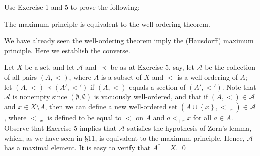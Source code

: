 \documentclass[a4paper,12pt]{article}
\begin{document}
\begin{exe}
	Use Exercise 1 and 5 to prove the following:\leavevmode \par
	\noindent {}\;\;
	The maximum principle is equivalent to the well-ordering theorem.
\end{exe}
\begin{sol}
	We have already seen the well-ordering theorem imply the (Hausdorff) maximum principle.
	Here we establish the converse.
	
	Let \( X \) be a set,
	and let \( \mathcal{A} \) and \( \prec \) be as at Exercise 5,
	say, let \( \mathcal{A} \) be the collection of all pairs \( (A,<) \),
	where \( A \) is a subset of \( X \)
	and \( < \) is a well-ordering of \( A \);
	let \( (A,<) \prec (A',<') \)
	if \( (A,<) \) equals a section of \( (A',<') \).
	Note that \( \mathcal{A} \) is nonempty since \( (\emptyset,\emptyset) \) is vacuously well-ordered,
	and that if \( (A,<) \in \mathcal{A} \) and \( x\in X \setminus A \),
	then we can define a new well-ordered set
	\( (A\cup \left\{ x \right\}, <_{+x})\in \mathcal{A} \),
	where \( <_{+x} \) is defined to be equal to \( < \) on \( A \)
	and \( a <_{+x} x \) for all \( a\in A \).
	Observe that Exercise 5 implies that
	\( \mathcal{A} \) satisfies the hypothesis of Zorn's lemma,
	which, as we have seen in \S11, is equivalent to the maximum principle.
	Hence, \( \mathcal{A} \) has a maximal element.
	It is easy to verify that \( A^{\ast}= X \).
	\qed\end{sol}
\end{document}
